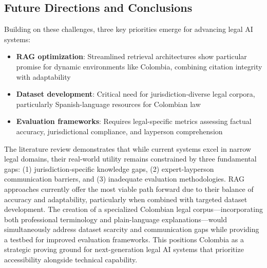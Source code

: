 \subsection{Future Directions and Conclusions}
Building on these challenges, three key priorities emerge for advancing legal AI systems:
\begin{itemize}
    \item \textbf{RAG optimization}: Streamlined retrieval architectures show particular promise for dynamic environments like Colombia, combining citation integrity with adaptability
    
    \item \textbf{Dataset development}: Critical need for jurisdiction-diverse legal corpora, particularly Spanish-language resources for Colombian law
    
    \item \textbf{Evaluation frameworks}: Requires legal-specific metrics assessing factual accuracy, jurisdictional compliance, and layperson comprehension
\end{itemize}
The literature review demonstrates that while current systems excel in narrow legal domains, their real-world utility remains constrained 
by three fundamental gaps: (1) jurisdiction-specific knowledge gaps, (2) expert-layperson communication barriers, and 
(3) inadequate evaluation methodologies. RAG approaches currently offer the most viable path forward due to their balance 
of accuracy and adaptability, particularly when combined with targeted dataset development. The creation of a specialized Colombian 
legal corpus—incorporating both professional terminology and plain-language explanations—would simultaneously address dataset scarcity 
and communication gaps while providing a testbed for improved evaluation frameworks. This positions Colombia as a strategic proving ground 
for next-generation legal AI systems that prioritize accessibility alongside technical capability.

